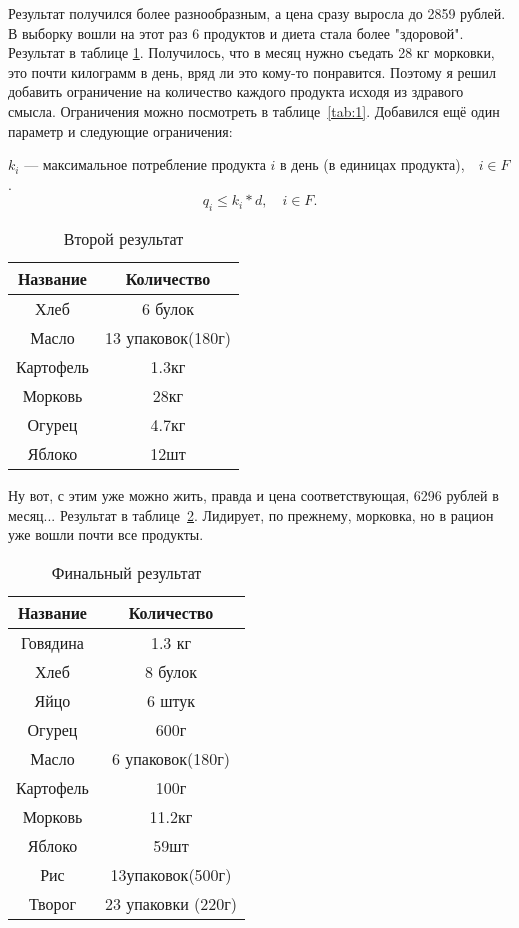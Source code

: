 \documentclass[]{article}
\begin{document}
Результат получился более разнообразным, а цена сразу выросла до 2859 рублей. В
выборку вошли на этот раз 6 продуктов и диета стала более "здоровой". Результат
в таблице \ref{tab:3}.
Получилось, что в месяц нужно съедать 28 кг морковки, это почти килограмм в день,
вряд ли это кому-то понравится. Поэтому я решил добавить ограничение на количество
каждого продукта исходя из здравого смысла. Ограничения можно посмотреть в таблице~\ref{tab:1}.
Добавился ещё один параметр и следующие ограничения:
\par\noindent
$k_i$ --- максимальное потребление продукта $i$ в день (в единицах продукта),$\quad i\in F$.
\begin{equation}
	q_i \leq k_i*d,\quad i\in F.
\end{equation}
\begin{table}
	\caption{Второй результат}
	\centering
	\label{tab:3}
	\begin{tabular}{|c|c|}
		\hline
		Название&Количество\\
		\hline
		Хлеб & 6 булок\\
		\hline
		Масло & 13 упаковок(180г)\\
		\hline
		Картофель & 1.3кг\\
		\hline
		Морковь & 28кг\\
		\hline
		Огурец & 4.7кг\\
		\hline
		Яблоко & 12шт\\
		\hline

	\end{tabular}

\end{table}

Ну вот, с этим уже можно жить, правда и цена соответствующая, 6296 рублей в месяц... Результат в таблице~\ref{tab:4}. Лидирует, по прежнему,
морковка, но в рацион уже вошли почти все продукты.
\begin{table}
	\caption{Финальный результат}
	\centering
	\label{tab:4}
	\begin{tabular}{|c|c|}
		\hline
		Название&Количество\\
		\hline
		Говядина & 1.3 кг\\
		\hline
		Хлеб & 8 булок\\
		\hline
		Яйцо & 6 штук\\
		\hline
		Огурец & 600г\\
		\hline
		Масло & 6 упаковок(180г)\\
		\hline
		Картофель & 100г\\
		\hline
		Морковь & 11.2кг\\
		\hline
		Яблоко & 59шт\\
		\hline
		Рис & 13упаковок(500г) \\
		\hline
		Творог & 23 упаковки (220г)\\
		\hline

	\end{tabular}

\end{table}
\end{document}
